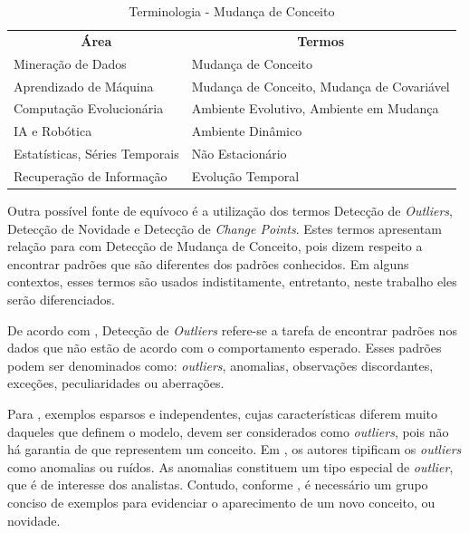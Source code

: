 \documentclass[qual, classic, a4paper]{ufbathesis}
\begin{document}
\begin{center} 
\begin{table}[!ht]
\label{tbl:taxonomy}
\begin{tabularx}{\textwidth}{|l|X|}
\cline{1-2}
\multicolumn{1}{|c|}{\textbf{Área}} & \multicolumn{1}{c|}{\textbf{Termos}}       \\ \cline{1-2}
Mineração de Dados                  & Mudança de Conceito                        \\ \cline{1-2}
Aprendizado de Máquina              & Mudança de Conceito, Mudança de Covariável \\ \cline{1-2}
Computação Evolucionária            & Ambiente Evolutivo, Ambiente em Mudança    \\ \cline{1-2}
IA e Robótica                       & Ambiente Dinâmico                          \\ \cline{1-2}
Estatísticas, Séries Temporais      & Não Estacionário                           \\ \cline{1-2}
Recuperação de Informação           & Evolução Temporal                          \\ \cline{1-2}
\end{tabularx}
\caption{Terminologia - Mudança de Conceito \cite{Zliobaite:2010}}
\end{table}
\end{center}

Outra possível fonte de equívoco é a utilização dos termos Detecção de \textit{Outliers}, Detecção de Novidade e Detecção de \textit{Change Points}.
Estes termos apresentam relação para com Detecção de Mudança de Conceito, pois dizem respeito a encontrar padrões que são diferentes dos padrões conhecidos.
Em alguns contextos, esses termos são usados indistitamente, entretanto, neste trabalho eles serão diferenciados.

De acordo com \cite{Chandola:2009:ADS:1541880.1541882}, 
Detecção de \textit{Outliers} refere-se a tarefa de encontrar padrões nos dados que não estão de acordo com o comportamento esperado.
Esses padrões podem ser denominados como: \textit{outliers}, anomalias, observações discordantes, exceções, peculiaridades ou aberrações.

Para \cite{Gama:2010:KDD:1855075}, exemplos esparsos e independentes, cujas características diferem muito daqueles que definem o modelo, 
devem ser considerados como \textit{outliers}, pois não há garantia de que representem um conceito. 
Em \cite{Aggarwal:2003:FCE:1315451.1315460}, os autores tipificam os \textit{outliers} como anomalias ou ruídos.
As anomalias constituem um tipo especial de \textit{outlier}, que é de interesse dos analistas.
Contudo, conforme \cite{Gama:2010:KDD:1855075}, é necessário um grupo conciso de exemplos para evidenciar o aparecimento de um novo conceito, ou novidade.
\end{document}
